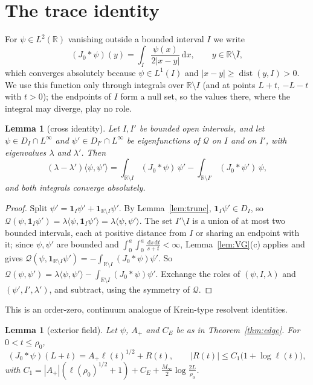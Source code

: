 \documentclass[11pt]{amsart}
\newcommand{\R}{\mathbb{R}}
\newcommand{\one}{\mathbf{1}}
\newcommand{\dd}{\,\mathrm{d}}
\DeclareMathOperator{\dist}{dist}
\newtheorem{lemma}[theorem]{Lemma}
\theoremstyle{definition}
\theoremstyle{remark}
\numberwithin{equation}{section}
\begin{document}
\section{The trace identity}\label{sec:trace}

For $\psi\in L^2(\R)$ vanishing outside a bounded interval $I$ we write\[(J_0*\psi)(y)=\int_I\frac{\psi(x)}{2|x-y|}\dd x,\qquad y\in\R\setminus\overline I,\]which converges absolutely because $\psi\in L^1(I)$ and $|x-y|\ge\dist(y,I)>0$. We use this function only through integrals over $\R\setminus I$ (and at points $L+t$, $-L-t$ with $t>0$); the endpoints of $I$ form a null set, so the values there, where the integral may diverge, play no role.

\begin{lemma}[cross identity]\label{lem:cross}
Let $I,I'$ be bounded open intervals, and let $\psi\in D_I\cap L^\infty$ and $\psi'\in D_{I'}\cap L^\infty$ be eigenfunctions of $\mathcal Q$ on $I$ and on $I'$, with eigenvalues $\lambda$ and $\lambda'$. Then
\[
(\lambda-\lambda')\langle\psi,\psi'\rangle=\int_{\R\setminus I}(J_0*\psi)\,\psi'-\int_{\R\setminus I'}(J_0*\psi')\,\psi,
\]
and both integrals converge absolutely.
\end{lemma}

\begin{proof}
Split $\psi'=\one_I\psi'+\one_{\R\setminus I}\psi'$. By Lemma~\ref{lem:trunc}, $\one_I\psi'\in D_I$, so $\mathcal Q(\psi,\one_I\psi')=\lambda\langle\psi,\one_I\psi'\rangle=\lambda\langle\psi,\psi'\rangle$. The set $I'\setminus I$ is a union of at most two bounded intervals, each at positive distance from $I$ or sharing an endpoint with it; since $\psi,\psi'$ are bounded and $\int_0^a\!\int_0^a\frac{\dd s\dd t}{s+t}<\infty$, Lemma~\ref{lem:VG}(c) applies and gives $\mathcal Q(\psi,\one_{\R\setminus I}\psi')=-\int_{\R\setminus I}(J_0*\psi)\psi'$. So $\mathcal Q(\psi,\psi')=\lambda\langle\psi,\psi'\rangle-\int_{\R\setminus I}(J_0*\psi)\psi'$. Exchange the roles of $(\psi,I,\lambda)$ and $(\psi',I',\lambda')$, and subtract, using the symmetry of $\mathcal Q$.
\end{proof}

This is an order-zero, continuum analogue of Krein-type resolvent identities.

\begin{lemma}[exterior field]\label{lem:field}
Let $\psi$, $A_+$ and $C_E$ be as in Theorem~\ref{thm:edge}. For $0<t\le\rho_0$,
\[
(J_0*\psi)(L+t)=A_+\ell(t)^{1/2}+R(t),\qquad|R(t)|\le C_1\bigl(1+\log\ell(t)\bigr),
\]
with $C_1=|A_+|(\ell(\rho_0)^{1/2}+1)+C_E+\frac{M_\infty}2\log\frac{2L}{\rho_0}$.
\end{lemma}
\end{document}

